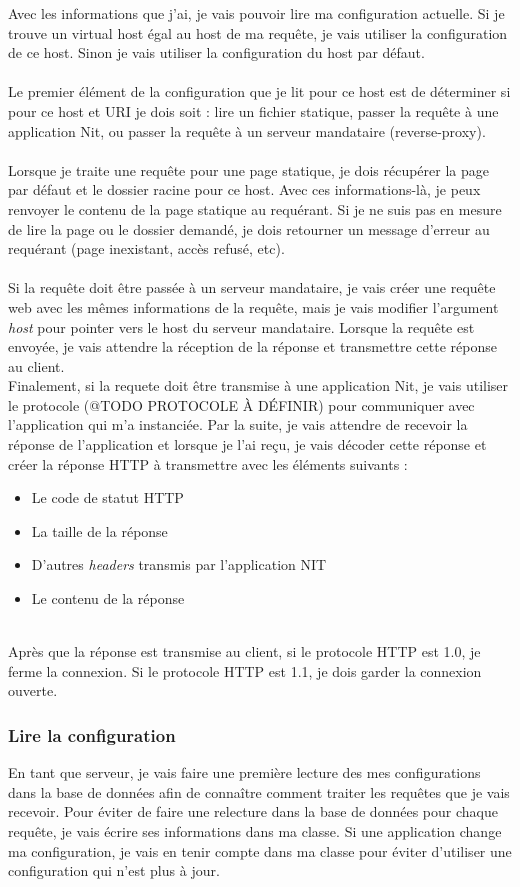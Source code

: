 \documentclass{scrreprt}
\begin{document}
Avec les informations que j'ai, je vais pouvoir lire ma configuration actuelle. Si
je trouve un virtual host égal au host de ma requête, je vais utiliser la configuration
de ce host. Sinon je vais utiliser la configuration du host par défaut. \\
\\
Le premier élément de la configuration que je lit pour ce host est de déterminer
si pour ce host et URI je dois soit : lire un fichier statique, passer la requête
à une application Nit, ou passer la requête à un serveur mandataire (reverse-proxy).\\
\\
Lorsque je traite une requête pour une page statique, je dois récupérer la page par
défaut et le dossier racine pour ce host. Avec ces informations-là, je peux renvoyer
le contenu de la page statique au requérant. Si je ne suis pas en mesure de lire
la page ou le dossier demandé, je dois retourner un message d'erreur au requérant
(page inexistant, accès refusé, etc).\\
\\
Si la requête doit être passée à un serveur mandataire, je vais créer
une requête web avec les mêmes informations de la requête, mais je vais modifier
l'argument \textit{host} pour pointer vers le host du serveur mandataire. Lorsque
la requête est envoyée, je vais attendre la réception de la réponse et transmettre
cette réponse au client.
\\
Finalement, si la requete doit être transmise à une application Nit, je vais utiliser
le protocole (@TODO PROTOCOLE À DÉFINIR) pour communiquer avec l'application
qui m'a instanciée. Par la suite, je vais attendre de recevoir la réponse de l'application
et lorsque je l'ai reçu, je vais décoder cette réponse et créer la réponse HTTP
à transmettre avec les éléments suivants :
\begin{itemize}
    \item Le code de statut HTTP
    \item La taille de la réponse
    \item D'autres \textit{headers} transmis par l'application NIT
    \item Le contenu de la réponse
\end{itemize}
\\
Après que la réponse est transmise au client, si le protocole HTTP est 1.0, je ferme
la connexion. Si le protocole HTTP est 1.1, je dois garder la connexion
ouverte.

\subsubsection{Lire la configuration}
En tant que serveur, je vais faire une première lecture des mes configurations
dans la base de données afin de connaître comment traiter les requêtes que je 
vais recevoir.
Pour éviter de faire une relecture dans la base de données pour chaque requête,
je vais écrire ses informations dans ma classe.
Si une application change ma configuration, je vais en tenir compte dans ma
classe pour éviter d'utiliser une configuration qui n'est plus à jour.
\end{document}
